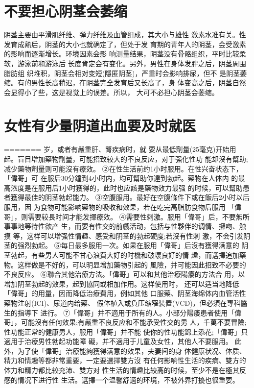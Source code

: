 \documentclass[12pt,UTF8]{ctexbook}
\begin{document}
\section{不要担心阴茎会萎缩}
阴茎主要由平滑肌纤维、弹力纤维及血管组成，其大小与雄性
激素水准有关。性发育成熟后，阴茎的大小也就确定了，但处于发
育期的青年人的阴茎，会受激素的影响而逐渐增长。环境因素会影
响测量结果，阴茎没有骨骼组织，平时比较柔软，游泳前和游泳后
长度肯定会有变化。另外，男性在身体发胖之后，阴茎周围脂肪组
织堆积，阴茎会相对变短(隱匿阴茎)，严重时会影响排尿，但不
是阴茎萎缩。有的男性长高稍迟，在阴茎完全发育后又长高了，身
体变高之后，阴茎自然会显得小了些，这是视觉上的误差。所以，
大可不必担心阴茎会萎缩。

\section{女性有少量阴道出血要及时就医}
=======
岁，或者有嚴重肝、腎疾病时，就
要从最低劑量(25毫克)开始用
起。盲目增加藥物劑量，可能招致较大的不良反应，对于强化性功
能却沒有幫助;减少藥物劑量则可能沒有療效。
②在性生活前约1小时服用。在性兴奋状态下，「偉哥」可
在服后30分鐘到4小时内，均可幫助你達到勃起。藥物在人体内
的最高浓度是在服用后1小时獲得的，此时也应該是藥物效力最强
的时候，可以幫助患者獲得最佳的阴茎勃起能力。
③空腹服用。最好在空腹條件下或在飯后2小时以后服用，因
为食物可能影响藥物的吸收和效果，若在吃完高脂肪食物后服用
「偉哥」，则需要较長时间才能发揮療效。
④需要性刺激。服用「偉哥」后，不要無所事事地等待性欲产
生，而要有性交的前戲活动，包括与性夥伴的调情、擁吻、触摸
等，这样可以增强性情趣、感受和阴茎的勃起硬度;若沒有性刺
激，不会引发阴茎的强烈勃起。
⑤每日最多服用一次。如果在服用「偉哥」后沒有獲得满意的
阴茎勃起，有些男人可能不甘心浪費大好的时機和破壞良好的情
趣，而選擇追加藥物。这样做是不好的，可以明显增加藥物引起的
風險，并可能因此招致不必要的不良反应。
⑥聯合其他治療方法。「偉哥」可以和其他治療陽痿的方法合
用，以增加阴茎勃起的效果，起到協同或相加作用。这样使用时，
还可以适当地降低「偉哥」的用量，因而降低治療費用，例如其他
口服藥、阴茎海绵体内血管活性藥物注射(ICI)、尿道内给藥、
假体植入或負压缩窄裝置(VCD)，但必須在專科醫生的指導下
进行。
⑦「偉哥」并不適用于所有的人。小部分陽痿患者使用「偉
哥」，可能沒有任何效果;有嚴重不良反应和不能承受性交的男
人，千萬不要冒險;性功能正常的健康男人，服用「偉哥」并不能
使你的性功能錦上添花;「偉哥」只適用于治療男性勃起功能障
礙，并不適用于儿童及女性，其他人不要服用。
此外，为了使「偉哥」治療能夠獲得满意的效果，夫妻间的身
体健康状况、体质、精力和情趣等都非常重要，一定要選擇雙方沒
有任何影响性生活的疾病、雙方的体力和精力都比较充沛、雙方对
性生活的情趣比较高的时候，至少不是在極其反感的情况下进行性
生活。選擇一个温馨舒適的环境，不被外界打擾也很重要。
\end{document}
